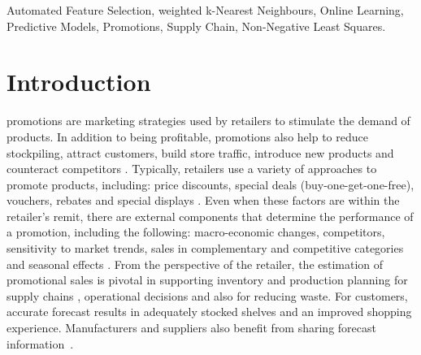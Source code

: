 \documentclass{ieeeaccess}
\begin{document}
\begin{keywords}
Automated Feature Selection, weighted k-Nearest Neighbours, Online Learning, Predictive Models, Promotions, Supply Chain, Non-Negative Least Squares.
\end{keywords}

\titlepgskip=-15pt

\maketitle

\section{Introduction} \label{sect:Intro}

 promotions are marketing strategies used by retailers to stimulate the demand of products. In addition to being profitable, promotions also help to reduce stockpiling, attract customers, build store traffic, introduce new products and counteract competitors \cite{gomez2007empirical, ailawadi2006promotion, natter2007practice}. Typically, retailers use a variety of approaches to promote products, including: price discounts, special deals (buy-one-get-one-free), vouchers, rebates and special displays \cite{blattberg1990sales}. Even when these factors are within the retailer's remit, there are external components that determine the performance of a promotion, including the following: macro-economic changes, competitors, sensitivity to market trends, sales in complementary and competitive categories and seasonal effects \cite{blattberg1995promotions}. From the perspective of the retailer, the estimation of promotional sales is pivotal in supporting inventory and production planning for supply chains \cite{fildes2016use}, operational decisions and also for reducing waste. For customers, accurate forecast results in adequately stocked shelves and an improved shopping experience. Manufacturers and suppliers also benefit from sharing forecast information~\cite{alamdar2018pricing}.
\end{document}

